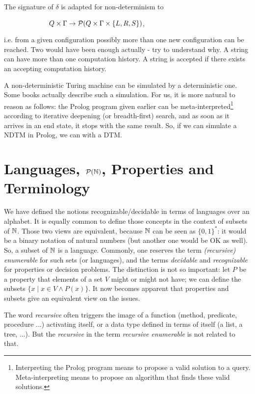 The signature of $\delta$ is adapted for non-determinism to

~~~~~~~~~~~~~$Q \times \Gamma \rightarrow {\cal P}(Q \times \Gamma
\times \{L,R,S\})$,

i.e. from a given configuration possibly more than one new
configuration can be reached. Two would have been enough actually -
try to understand why. A string can have more than one computation history. A string is accepted if there exists an accepting computation history.

A non-deterministic Turing machine can be simulated by a
deterministic one. Some books actually describe such a
simulation. For us, it is more natural to reason as follows:
the Prolog program given earlier can be meta-interpreted\footnote{Interpreting the Prolog program means to propose a valid solution to a query. Meta-interpreting means to propose an algorithm that finds these valid solutions.} according to
iterative deepening (or breadth-first) search, and as soon as it arrives in an end state, it stops with the same result. So, if we can simulate a NDTM in Prolog, we can with a DTM. 


\section{Languages, ${\cal P}(\mathbb{N})$, Properties and Terminology}

We have defined the notions recognizable/decidable in terms of
languages over an alphabet. It is equally common to define those
concepts in the context of subsets of $\mathbb{N}$. Those two views are
equivalent, because $\mathbb{N}$ can be seen as $\{0,1\}^*$: it would be a
binary notation of natural numbers (but another one would be OK as
well). So, a subset of $\mathbb{N}$ is a language. Commonly, one reserves the
term {\em (recursive) enumerable} for such sets (or languages), and
the terms {\em decidable} and {\em recognizable} for properties or
decision problems. The distinction is not so important: let $P$ be a
property that elements of a set $V$ might or might not have; we can
define the subsets $\{x \mid x \in V \wedge P(x)\}$. It now becomes
apparent that properties and subsets give an equivalent view on the
issues.

The word {\em recursive} often triggers the image of a function
(method, predicate, procedure ...) activating itself, or a data type
defined in terms of itself (a list, a tree, ...). But the {\em
  recursive} in the term {\em recursive enumerable} is not related to
that.



